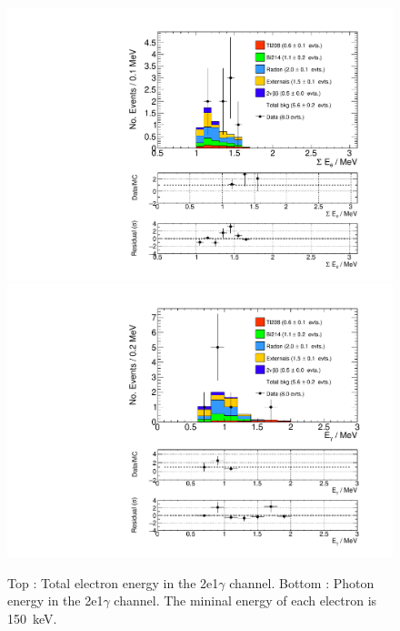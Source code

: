 \documentclass[main.tex]{subfiles}
\begin{document}
\begin{figure} [h!]
\begin{center}
\includegraphics[scale=0.36]{pictures/FinalResults/bb0nu2/150/SEe_bb0nu2NS.pdf}
\includegraphics[scale=0.36]{pictures/FinalResults/bb0nu2/150/Eg_bb0nu2NS.pdf}
\end{center}
\caption{Top : Total electron energy in the 2e1$\gamma$ channel. Bottom : Photon energy in the 2e1$\gamma$ channel. The mininal energy of each electron is 150~keV.}
\label{plot:SEeAndEg250bb0nu2}
\end{figure}
\end{document}
